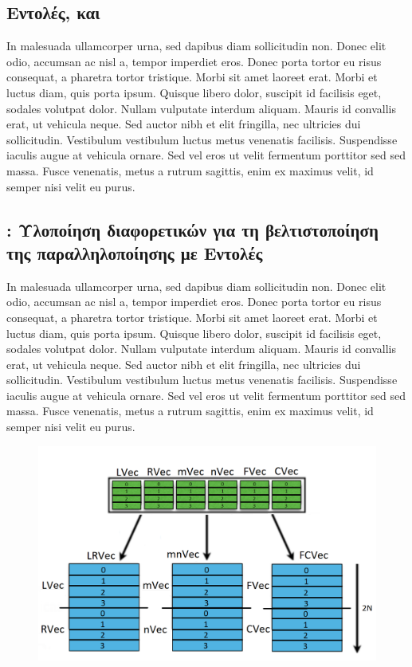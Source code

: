 \documentclass{article}
\begin{document}
\subsection{ Εντολές,  και  }

In malesuada ullamcorper urna, sed dapibus diam sollicitudin non. Donec elit odio, accumsan ac nisl a, tempor imperdiet eros. Donec porta tortor eu risus consequat, a pharetra tortor tristique. Morbi sit amet laoreet erat. Morbi et luctus diam, quis porta ipsum. Quisque libero dolor, suscipit id facilisis eget, sodales volutpat dolor. Nullam vulputate interdum aliquam. Mauris id convallis erat, ut vehicula neque. Sed auctor nibh et elit fringilla, nec ultricies dui sollicitudin. Vestibulum vestibulum luctus metus venenatis facilisis. Suspendisse iaculis augue at vehicula ornare. Sed vel eros ut velit fermentum porttitor sed sed massa. Fusce venenatis, metus a rutrum sagittis, enim ex maximus velit, id semper nisi velit eu purus.

\newpage
\subsection{: Υλοποίηση διαφορετικών  για τη βελτιστοποίηση της παραλληλοποίησης με  Εντολές }

In malesuada ullamcorper urna, sed dapibus diam sollicitudin non. Donec elit odio, accumsan ac nisl a, tempor imperdiet eros. Donec porta tortor eu risus consequat, a pharetra tortor tristique. Morbi sit amet laoreet erat. Morbi et luctus diam, quis porta ipsum. Quisque libero dolor, suscipit id facilisis eget, sodales volutpat dolor. Nullam vulputate interdum aliquam. Mauris id convallis erat, ut vehicula neque. Sed auctor nibh et elit fringilla, nec ultricies dui sollicitudin. Vestibulum vestibulum luctus metus venenatis facilisis. Suspendisse iaculis augue at vehicula ornare. Sed vel eros ut velit fermentum porttitor sed sed massa. Fusce venenatis, metus a rutrum sagittis, enim ex maximus velit, id semper nisi velit eu purus.

\begin{figure}[h!]
\centering
  \includegraphics[width=0.8\linewidth]{SCHEME.png}
  \caption{}
\end{figure}
\newpage
\end{document}
